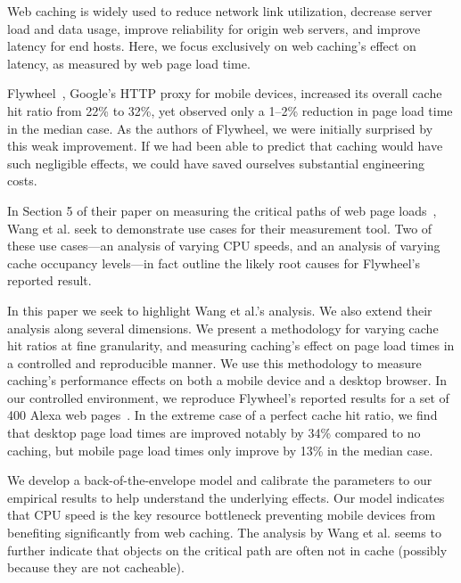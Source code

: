 \label{intro}
Web caching is widely used to reduce network link utilization, decrease server load and data usage, improve reliability for origin web servers, and improve latency for end hosts.
Here, we focus exclusively on web caching's effect on latency, as measured by web page load time.

Flywheel~\cite{flywheel}, Google's HTTP proxy for mobile devices, increased
its overall cache hit ratio from 22\% to 32\%, yet observed only a 1--2\% reduction in page load time in the median case.
As the authors of Flywheel, we were initially surprised by this weak 
improvement. If we had been able to predict that caching would have such
negligible effects, we could have saved ourselves substantial engineering costs. %

In Section 5 of their paper on measuring the critical paths of web page 
loads~\cite{wang2013demystifying}, Wang et al. seek to demonstrate use 
cases for their measurement tool. Two of these use cases---an analysis of varying CPU speeds, and an analysis of varying cache occupancy levels---in fact outline the likely root causes for Flywheel's reported result.

In this paper we seek to highlight Wang et al.'s analysis. We also extend 
their analysis along several dimensions. We present 
a methodology for varying cache hit ratios at fine granularity,
and measuring caching's effect on page load times in a controlled and 
reproducible manner.
We use this methodology to measure caching's performance effects on both a mobile device and a desktop browser.
In our controlled environment, we reproduce Flywheel's reported results for
a set of
400 Alexa web pages~\cite{alexa}.
In the extreme case of a perfect cache hit ratio, we find that desktop page load times are improved notably by 34\% compared to no caching, but mobile page load times only improve by 13\% in the median case.

We develop a back-of-the-envelope model and calibrate the parameters to 
our empirical results to help understand the underlying effects.
Our model indicates that CPU speed is the key resource bottleneck preventing mobile devices from benefiting significantly from web caching. 
The analysis by Wang et al. seems to further indicate that objects on the critical path are often not in cache (possibly because they are not cacheable).

